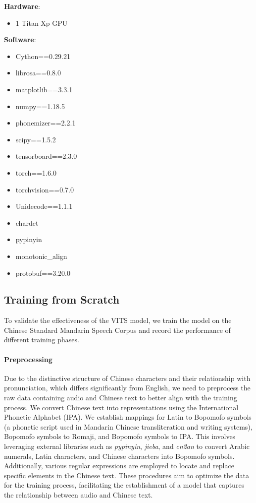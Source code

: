 \documentclass{article}
\begin{document}
\textbf{Hardware}:
\begin{itemize}
    \item 1 Titan Xp GPU
\end{itemize}
\textbf{Software}:
\begin{minipage}{0.45\textwidth}
    \begin{itemize}
        \item Cython==0.29.21
        \item librosa==0.8.0
        \item matplotlib==3.3.1
        \item numpy==1.18.5
        \item phonemizer==2.2.1
        \item scipy==1.5.2
        \item tensorboard==2.3.0
    \end{itemize}
\end{minipage}
\hfill
\begin{minipage}{0.45\textwidth}
    \begin{itemize}
        \item torch==1.6.0
        \item torchvision==0.7.0
        \item Unidecode==1.1.1
    \item chardet
    \item pypinyin
    \item monotonic\_align
    \item protobuf==3.20.0
    \end{itemize}
\end{minipage}

\subsection{Training from Scratch}\label{sub:train}
To validate the effectiveness of the VITS model, we train the model on the Chinese Standard Mandarin Speech Corpus and record the performance of different training phases.  

\paragraph{Preprocessing}
Due to the distinctive structure of Chinese characters and their relationship with pronunciation, which differs significantly from English, we need to preprocess the raw data containing audio and Chinese text to better align with the training process. We convert Chinese text into representations using the International Phonetic Alphabet (IPA). We establish mappings for Latin to Bopomofo symbols (a phonetic script used in Mandarin Chinese transliteration and writing systems), Bopomofo symbols to Romaji, and Bopomofo symbols to IPA. This involves leveraging external libraries such as \textit{pypinyin}, \textit{jieba}, and \textit{cn2an} to convert Arabic numerals, Latin characters, and Chinese characters into Bopomofo symbols. Additionally, various regular expressions are employed to locate and replace specific elements in the Chinese text. These procedures aim to optimize the data for the training process, facilitating the establishment of a model that captures the relationship between audio and Chinese text.
\end{document}
